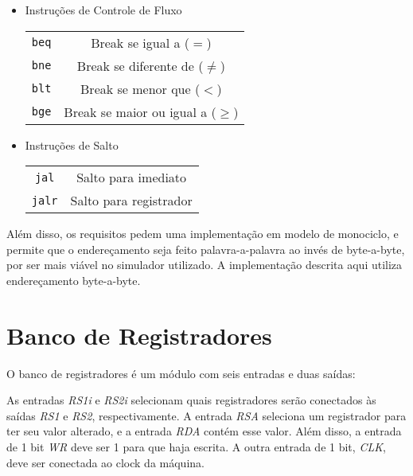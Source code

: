\documentclass[twocolumn]{article}
\newcommand{\circuit}[1]{}
\begin{document}
\begin{itemize}
\begin{tabular}{ c c }
  \end{tabular}
\item Instruções de Controle de Fluxo \\
  \begin{tabular}{ c c }
    \verb|beq| & \hspace*{\fill} Break se igual a ($=$) \\
    \verb|bne| & \hspace*{\fill} Break se diferente de ($\neq$)\\
    \verb|blt| & \hspace*{\fill} Break se menor que ($<$) \\
    \verb|bge| & \hspace*{\fill} Break se maior ou igual a ($\geq$) \\
  \end{tabular}
\item Instruções de Salto \\
  \begin{tabular}{ c c }
    \verb|jal| & \hspace*{\fill} Salto para imediato \\
    \verb|jalr| & \hspace*{\fill} Salto para registrador
  \end{tabular}
\end{itemize}

Além disso, os requisitos pedem uma implementação em modelo de monociclo, e
permite que o endereçamento seja feito palavra-a-palavra ao invés de
byte-a-byte, por ser mais viável no simulador utilizado. A implementação
descrita aqui utiliza endereçamento byte-a-byte.

\section{Banco de Registradores}

O banco de registradores é um módulo com seis entradas e duas saídas:

\circuit{register-bank}

As entradas \textit{RS1i} e \textit{RS2i} selecionam quais registradores serão
conectados às saídas \textit{RS1} e \textit{RS2}, respectivamente. A entrada
\textit{RSA} seleciona um registrador para ter seu valor alterado, e a entrada
\textit{RDA} contém esse valor. Além disso, a entrada de 1 bit \textit{WR} deve
ser 1 para que haja escrita. A outra entrada de 1 bit, \textit{CLK}, deve ser
conectada ao clock da máquina.
\end{document}
